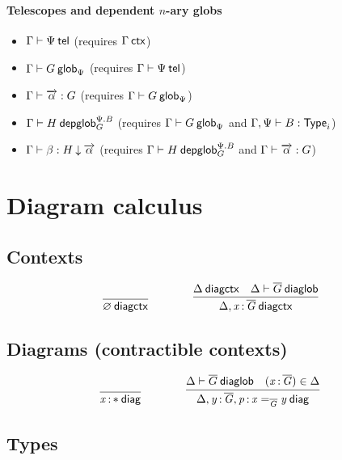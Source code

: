 \paragraph{Telescopes and dependent $n$-ary globs}

\begin{itemize}
\item ${\Gamma} \vdash {\Psi} \: \mathsf{tel}$ (requires ${\Gamma} \: \mathsf{ctx}$)
\item ${\Gamma} \vdash {G} \: \mathsf{glob}_{\Psi}$ (requires ${\Gamma} \vdash {\Psi} \: \mathsf{tel}$)
\item ${\Gamma} \vdash {\ensuremath{\overrightarrow{\alpha}}} : {G}$ (requires
  ${\Gamma} \vdash {G} \: \mathsf{glob}_{\Psi}$)
\item ${\Gamma} \vdash {H} \: \mathsf{depglob}^{\Psi.B}_{G}$ (requires ${\Gamma} \vdash {G} \: \mathsf{glob}_{\Psi}$
  and ${\Gamma,\Psi} \vdash {B} : {\mathsf{Type}_{i}}$)
\item ${\Gamma} \vdash {\beta} : {H}\mathbin{\downarrow}{\overrightarrow{\alpha}}$ (requires
  ${\Gamma} \vdash {H} \: \mathsf{depglob}^{\Psi.B}_{G}$ and ${\Gamma} \vdash {\ensuremath{\overrightarrow{\alpha}}} : {G}$)
\end{itemize}

\section{Diagram calculus}

\subsection{Contexts}

\begin{small}
  \[
  \infer{\wfdiagctx{\emptyctx}}{}
  \qquad\qquad
  \infer
  {\wfdiagctx{\Delta,\tptm{x}{\diag G}}}
  {\wfdiagctx{\Delta} & \wfdiaglob{\Delta}{\diag G}}\]
\end{small}

\subsection{Diagrams (contractible contexts)}

\begin{small}
  \[
  \infer{\wfdiag{\tptm{x}{\diagbase}}}{}
  \qquad\qquad
  \infer{\wfdiag{\Delta,\tptm{y}{\diag G},\tptm{p}{\homj{\diag{G}}{x}{y}}}}
  {\wfdiaglob{\Delta}{\diag G}
    & (\tptm{x}{\diag{G}}) \in \Delta}\]
\end{small}

\subsection{Types}

